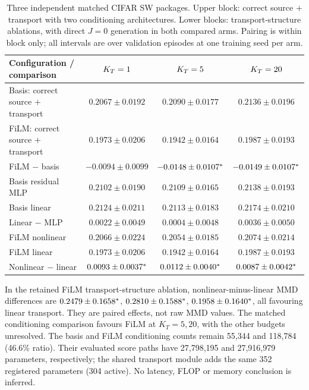 \begin{table}[h]
\centering\small
\caption{Three independent matched CIFAR SW packages. Upper block: correct source $+$ transport with two conditioning architectures. Lower blocks: transport-structure ablations, with direct $J=0$ generation in both compared arms. Pairing is within block only; all intervals are over validation episodes at one training seed per arm.}
\begin{tabular}{lccc}
\toprule
Configuration / comparison & $K_T=1$ & $K_T=5$ & $K_T=20$\\
\midrule
\shortstack[l]{Basis: correct source\\$+$ transport} & $0.2067\pm0.0192$ & $0.2090\pm0.0177$ & $0.2136\pm0.0196$\\
\shortstack[l]{FiLM: correct source\\$+$ transport} & $0.1973\pm0.0206$ & $0.1942\pm0.0164$ & $0.1987\pm0.0193$\\
FiLM $-$ basis & $-0.0094\pm0.0099$ & $-0.0148\pm0.0107^{\ast}$ & $-0.0149\pm0.0107^{\ast}$\\
\midrule
Basis residual MLP & $0.2102\pm0.0190$ & $0.2109\pm0.0165$ & $0.2138\pm0.0193$\\
Basis linear & $0.2124\pm0.0211$ & $0.2113\pm0.0183$ & $0.2174\pm0.0210$\\
Linear $-$ MLP & $0.0022\pm0.0049$ & $0.0004\pm0.0048$ & $0.0036\pm0.0050$\\
\midrule
FiLM nonlinear & $0.2066\pm0.0224$ & $0.2054\pm0.0185$ & $0.2074\pm0.0214$\\
FiLM linear & $0.1973\pm0.0206$ & $0.1942\pm0.0164$ & $0.1987\pm0.0193$\\
Nonlinear $-$ linear & $0.0093\pm0.0037^{\ast}$ & $0.0112\pm0.0040^{\ast}$ & $0.0087\pm0.0042^{\ast}$\\
\bottomrule
\end{tabular}
\end{table}

In the retained FiLM transport-structure ablation, nonlinear-minus-linear MMD differences are $0.2479\pm0.1658^{\ast}$, $0.2810\pm0.1588^{\ast}$, $0.1958\pm0.1640^{\ast}$, all favouring linear transport. They are paired effects, not raw MMD values. The matched conditioning comparison favours FiLM at $K_T=5,20$, with the other budgets unresolved. The basis and FiLM conditioning counts remain 55,344 and 118,784 (46.6\% ratio). Their evaluated score paths have 27,798,195 and 27,916,979 parameters, respectively; the shared transport module adds the same 352 registered parameters (304 active). No latency, FLOP or memory conclusion is inferred.

